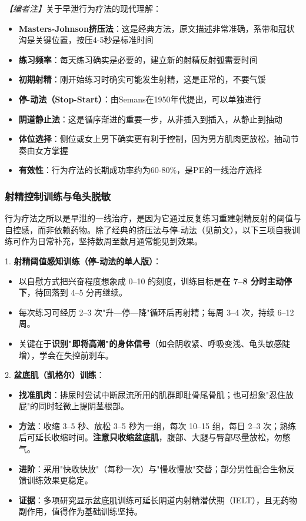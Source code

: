 \noindent\textit{【编者注】}关于早泄行为疗法的现代理解：
\begin{itemize}
	\item \textbf{Masters-Johnson挤压法}：这是经典方法，原文描述非常准确，系带和冠状沟是关键位置，按压4-5秒是标准时间
	\item \textbf{练习频率}：每天练习确实是必要的，建立新的射精反射弧需要时间
	\item \textbf{初期射精}：刚开始练习时确实可能发生射精，这是正常的，不要气馁
	\item \textbf{停-动法（Stop-Start）}：由Semans在1950年代提出，可以单独进行
	\item \textbf{阴道静止法}：这是循序渐进的重要一步，从非插入到插入，从静止到抽动
	\item \textbf{体位选择}：侧位或女上男下确实更有利于控制，因为男方肌肉更放松，抽动节奏由女方掌握
	\item \textbf{有效性}：行为疗法的长期成功率约为60-80\%，是PE的一线治疗选择
\end{itemize}

\subsubsection{射精控制训练与龟头脱敏}

行为疗法之所以是早泄的一线治疗，是因为它通过反复练习重建射精反射的阈值与自控感，而非依赖药物。除了经典的挤压法与停-动法（见前文），以下三项自我训练可作为日常补充，坚持数周至数月通常能见到效果。

1. \textbf{射精阈值感知训练（停-动法的单人版）}：
  \begin{itemize}
  \item 以自慰方式把兴奋程度想象成 0--10 的刻度，训练目标是\textbf{在 7--8 分时主动停下}，待回落到 4--5 分再继续。
  \item 每次练习可经历 2--3 次"升—停—降"循环后再射精；每周 3--4 次，持续 6--12 周。
  \item 关键在于\textbf{识别"即将高潮"的身体信号}（如会阴收紧、呼吸变浅、龟头敏感陡增），学会在失控前刹车。
  \end{itemize}

2. \textbf{盆底肌（凯格尔）训练}：
  \begin{itemize}
  \item \textbf{找准肌肉}：排尿时尝试中断尿流所用的肌群即耻骨尾骨肌；也可想象"忍住放屁"的同时轻微上提阴茎根部。
  \item \textbf{方法}：收缩 3--5 秒、放松 3--5 秒为一组，每次 10--15 组，每日 2--3 次；熟练后可延长收缩时间。\textbf{注意只收缩盆底肌}，腹部、大腿与臀部尽量放松，勿憋气。
  \item \textbf{进阶}：采用"快收快放"（每秒一次）与"慢收慢放"交替；部分男性配合生物反馈训练效果更稳定。
  \item \textbf{证据}：多项研究显示盆底肌训练可延长阴道内射精潜伏期（IELT），且无药物副作用，值得作为基础训练坚持。
  \end{itemize}

